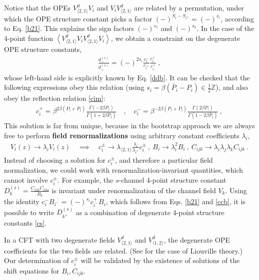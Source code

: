\documentclass[12pt, a4paper]{article}
\theoremstyle{break}
\begin{document}
Notice that the OPEs $V^d_{\langle 2,1\rangle}V_i$ and $V_iV^d_{\langle 2,1\rangle}$ are related by a permutation, under which the OPE structure constant picks a factor $(-)^{S_i-S_{i^\pm}} = (-)^{s_i}$, according to Eq. \eqref{b21}. This explains the sign factors $(-)^{s_1}$ and $(-)^{s_3}$. In the case of the 4-point function $\left<V_{\langle 2,1\rangle}^d V_iV_{\langle 2,1\rangle}^d V_i\right>$, we obtain a constraint on the degenerate OPE structure constants,
\begin{align}
 \frac{d^{(s)}_-}{d^{(s)}_+}= (-)^{2s_i}\frac{c_i^-}{c_{i^+}^-} \frac{c_{i^-}^+}{c_i^+}\ ,  
 \label{ddcccc}
\end{align}
whose left-hand side is explicitly known by Eq. \eqref{ddb}. It can be checked that the following expressions obey this relation (using $s_i=\beta(\bar P_i-P_i) \in \frac12\mathbb{Z}$), and also obey the reflection relation \eqref{cim}: 
\begin{align}
 c^+_i = \beta^{2\beta(P_i+\bar P_i)} \frac{\Gamma(-2\beta P_i)}{\Gamma(1+2\beta \bar P_i)} \quad , \quad c^-_i = \beta^{-2\beta(P_i+\bar P_i)} \frac{\Gamma(2\beta P_i)}{\Gamma(1-2\beta \bar P_i)}\ ,
 \label{cpcm}
\end{align}
This solution is far from unique, because in the bootstrap approach we are always free to perform \textbf{field renormalizations} using arbitrary constant coefficients $\lambda_i$,
\begin{align}
 V_i(z) \to \lambda_i V_i(z)\quad \implies \quad c_i^\pm \to \lambda_{\langle 2,1\rangle}\frac{\lambda_i}{\lambda_{i^\pm}}c_i^\pm \ , \  B_i \to \lambda_i^2B_i \ , \ C_{ijk}\to \lambda_i\lambda_j\lambda_k C_{ijk}\ .
 \label{vlv}
\end{align}
Instead of choosing a solution for $c_i^\pm$, and therefore a particular field normalization, 
we could work with renormalization-invariant quantities, which cannot involve $c_i^\pm$. For example, the $s$-channel 4-point structure constant $D^{(s)}_k = \frac{C_{12k}C_{k34}}{B_k}$ is invariant under renormalization of the channel field $V_k$. Using the identity $c_i^- B_{i^-} = (-)^{s_i} c^+_{i^-} B_i$, which follows from Eqs. \eqref{b21} and \eqref{ccb}, it is possible to write $D^{(s)}_{k^+}$ as a combination of degenerate 4-point structure constants \eqref{cs}. 

In a CFT with two degenerate fields $V^d_{\langle 2,1\rangle}$ and $V^d_{\langle 1,2\rangle}$, the degenerate OPE coefficients for the two fields are related. (See \cite[Exercise 3.2]{rib14} for the case of Liouville theory.) Our determination of $c_i^\pm$ will be validated by the existence of solutions of the shift equations for $B_i,C_{ijk}$. 
\end{document}
